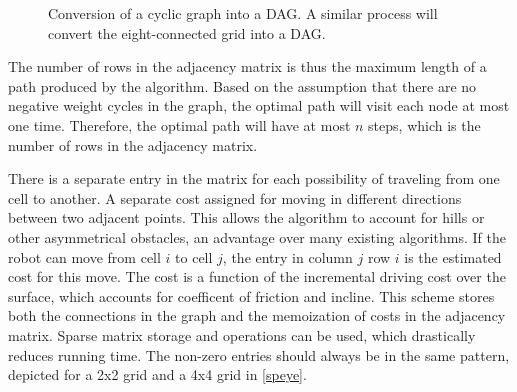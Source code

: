 \documentclass[journal]{IEEEtran}
\begin{document}
\begin{figure}[h]
\label{DAG}
\begin{center}
\end{center}
\caption{Conversion of a cyclic graph into a DAG. A similar process will convert the eight-connected grid into a DAG.}
\end{figure}
  
The number of rows in the adjacency matrix is thus the maximum length of a path produced by the algorithm.
Based on the assumption that there are no negative weight cycles in the graph, the optimal path will visit each node at most one time.
Therefore, the optimal path will have at most $n$ steps, which is the number of rows in the adjacency matrix. 

There is a separate entry in the matrix for each possibility of traveling from one cell to another.
A separate cost assigned for moving in different directions between  two adjacent points. 
This allows the algorithm to account for hills or other asymmetrical obstacles, an advantage over many existing algorithms.
If the robot can move from cell $i$ to cell $j$, the entry in column $j$ row $i$ is the estimated cost for this move. 
The cost is a function of the incremental driving cost over the surface, which accounts for coefficent of friction and incline.
This scheme stores both the connections in the graph and the memoization of costs in the adjacency matrix. 
Sparse matrix storage and operations can be used, which drastically reduces running time.
The non-zero entries should always be in the same pattern, depicted for a 2x2 grid and a 4x4 grid in \ref{speye}. 
\end{document}
